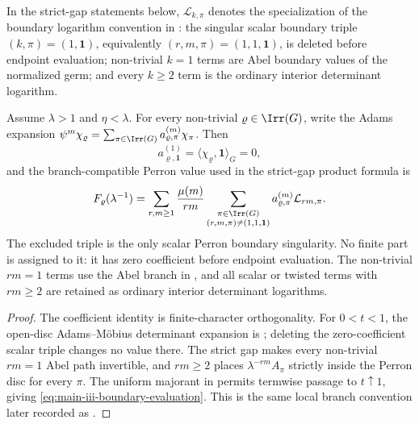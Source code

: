 \begin{remark}
  \label{rem:strict-gap-boundary-logarithm-notation}
  In the strict-gap statements below, \(\mathcal L_{k,\pi}\) denotes the
  specialization of the boundary logarithm convention in
  : the singular scalar
  boundary triple \((k,\pi)=(1,\mathbf1)\), equivalently
  \((r,m,\pi)=(1,1,\mathbf1)\), is deleted before endpoint evaluation;
  non-trivial \(k=1\) terms are Abel boundary values of the normalized germ;
  and every \(k\ge2\) term is the ordinary interior determinant logarithm.
\end{remark}

\begin{lemma}
  \label{lem:main-iii-boundary-evaluation}
  Assume \(\lambda>1\) and \(\eta<\lambda\).  For every non-trivial
  \(\varrho\in\Irr(G)\), write the Adams expansion
  \(\psi^m\chi_\varrho=\sum_{\pi\in\Irr(G)}a_{\varrho,
  \pi}^{(m)}\chi_\pi\).  Then
  \[
    a_{\varrho,
    \mathbf1}^{(1)}=
    \langle\chi_\varrho,
    \mathbf1\rangle_G=0,
  \]
  and the branch-compatible Perron value used in the strict-gap product formula is
  \begin{equation}\label{eq:main-iii-boundary-evaluation}
    F_\varrho(\lambda^{-1})
    =
    \sum_{r,m\ge1}\frac{\mu(m)}{rm}
      \sum_{\substack{\pi\in\Irr(G)\\(r,m,
      \pi)\neq(1,1,
      \mathbf1)}}
        a_{\varrho,
        \pi}^{(m)}\mathcal L_{rm,
        \pi}.
  \end{equation}
  The excluded triple is the only scalar Perron boundary singularity.  No finite
  part is assigned to it: it has zero coefficient before endpoint evaluation.
  The non-trivial \(rm=1\) terms use the Abel branch in
  , and all scalar or twisted
  terms with \(rm\ge2\) are retained as ordinary interior determinant
  logarithms.
\end{lemma}

\begin{proof}
  The coefficient identity is finite-character orthogonality.  For
  \(0<t<1\), the open-disc Adams--M\"obius determinant expansion is
  ; deleting the zero-coefficient
  scalar triple changes no value there.  The strict gap makes every non-trivial
  \(rm=1\) Abel path invertible, and \(rm\ge2\) places
  \(\lambda^{-rm}A_\pi\) strictly inside the Perron disc for every \(\pi\).
  The uniform majorant in 
  permits termwise passage to \(t\uparrow1\), giving
  \eqref{eq:main-iii-boundary-evaluation}.  This is the same local branch
  convention later recorded as .
\end{proof}

